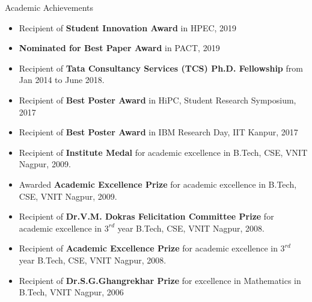 \documentclass{resume} %
\begin{document}
\begin{rSection}{Academic Achievements}
\begin{itemize}
\item Recipient of \textbf{Student Innovation Award} in HPEC, 2019
\item \textbf{Nominated for Best Paper Award} in PACT, 2019
\item Recipient of \textbf{Tata Consultancy Services (TCS) Ph.D. Fellowship} from Jan 2014 to June 2018.
\item Recipient of \textbf{Best Poster Award} in HiPC, Student Research Symposium, 2017
\item Recipient of \textbf{Best Poster Award} in IBM Research Day, IIT Kanpur, 2017
\item Recipient of \textbf{Institute Medal} for academic excellence in B.Tech, CSE, VNIT Nagpur, 2009.
\item Awarded \textbf{Academic Excellence Prize} for academic excellence in B.Tech, CSE, VNIT Nagpur, 2009.
\item Recipient of \textbf{Dr.V.M. Dokras Felicitation Committee Prize} for academic excellence in $3^{rd}$ year B.Tech, CSE, VNIT Nagpur, 2008.
\item Recipient of \textbf{Academic Excellence Prize} for academic excellence in $3^{rd}$ year B.Tech, CSE, VNIT Nagpur, 2008.
\item Recipient of \textbf{Dr.S.G.Ghangrekhar Prize} for excellence in Mathematics in B.Tech, VNIT Nagpur, 2006
\end{itemize}
\end{rSection}



\end{document}
